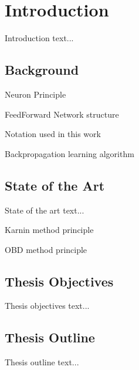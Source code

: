 \chapter{Introduction} \label{chap:introduction}
Introduction text...

\section{Background} \label{sec:background}
Neuron Principle

FeedForward Network structure

Notation used in this work

Backpropagation learning algorithm



\citep{article:perceptron}

\section{State of the Art} \label{sec:state_of_the_art}
State of the art text...  \citep{article:pruning_algorithms}

Karnin method principle

OBD method principle

\section{Thesis Objectives} \label{sec:thesis_objectives}
Thesis objectives text...

\section{Thesis Outline} \label{sec:thesis_outline}
Thesis outline text...